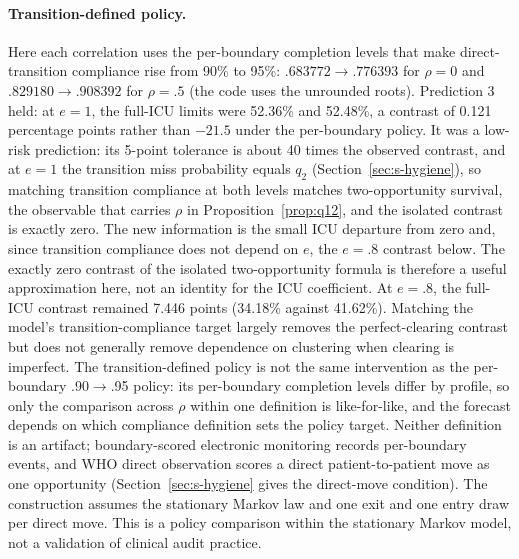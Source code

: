 \paragraph{Transition-defined policy.} Here each correlation uses the per-boundary
completion levels that make direct-transition compliance rise from 90\% to 95\%:
$.683772\to.776393$ for $\rho=0$ and $.829180\to.908392$ for $\rho=.5$ (the code
uses the unrounded roots). Prediction 3 held: at $e=1$, the full-ICU limits
were 52.36\% and 52.48\%, a contrast of 0.121 percentage points rather than
$-21.5$ under the per-boundary policy. It was a low-risk prediction: its
5-point tolerance is about 40 times the observed contrast, and at $e=1$ the
transition miss probability equals $q_2$ (Section~\ref{sec:s-hygiene}), so
matching transition compliance at both levels matches two-opportunity survival,
the observable that carries $\rho$ in Proposition~\ref{prop:q12}, and the
isolated contrast is exactly zero. The new information is the small ICU
departure from zero and, since transition compliance does not depend on $e$,
the $e=.8$ contrast below. The exactly zero contrast of the isolated
two-opportunity formula is therefore a useful approximation here, not an
identity for the ICU coefficient. At $e=.8$, the full-ICU contrast remained
7.446 points (34.18\% against 41.62\%). Matching the model's transition-compliance target largely removes
the perfect-clearing contrast but does not generally remove dependence on
clustering when clearing is imperfect. The transition-defined policy is not the
same intervention as the per-boundary .90$\to$.95 policy: its per-boundary
completion levels differ by profile, so only the comparison across $\rho$
within one definition is like-for-like, and the forecast depends on which
compliance definition sets the policy target. Neither definition is an
artifact; boundary-scored electronic monitoring records per-boundary events,
and WHO direct observation scores a direct patient-to-patient move as one
opportunity (Section~\ref{sec:s-hygiene} gives the direct-move condition). The construction assumes the stationary
Markov law and one exit and one entry draw per direct move. This is a policy
comparison within the stationary Markov model, not a validation of clinical
audit practice.

